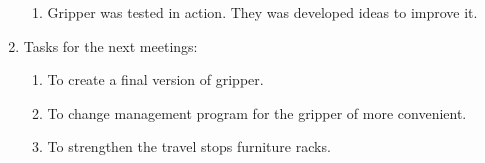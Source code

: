 \begin{enumerate}
\begin{enumerate}
      \item Gripper was tested in action. They was developed ideas to improve it.
      
    \end{enumerate}
    
	\item Tasks for the next meetings:
	\begin{enumerate}
	  \item To create a final version of gripper.
	  
	  \item To change management program for the gripper of more convenient.
	  
	  \item To strengthen the travel stops furniture racks.

    \end{enumerate}     
\end{enumerate}
\fillpage
